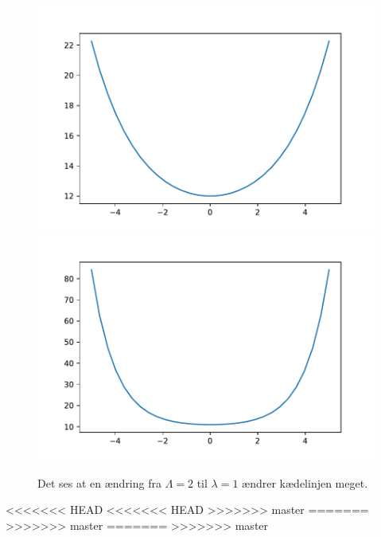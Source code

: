 \begin{figure}[h!]
\includegraphics[scale=0.5]{code/fig3}
\includegraphics[scale=0.5]{code/fig4}
\caption{Det ses at en ændring fra $\Lambda=2$ til $\lambda=1$ ændrer kædelinjen meget.}
\end{figure}

<<<<<<< HEAD
<<<<<<< HEAD
>>>>>>> master
=======
>>>>>>> master
=======
>>>>>>> master
